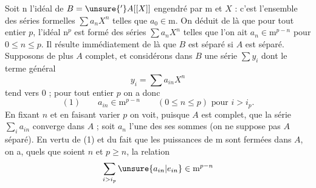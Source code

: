 Soit $\mathrm n$ l'idéal de $B=\unsure{'}A[[X]]$ engendré par $\mathrm m$ et $X$ : c'est l'ensemble des séries formelles $\sum a_nX^n$ telles que $a_0\in\mathrm m$. On déduit de là que pour tout entier $p$, l'idéal $\mathrm n^p$ est formé des séries $\sum a_nX^n$ telles que l'on ait $a_n\in\mathrm m^{p-n}$ pour $0\leqslant n\leqslant p$. Il résulte immédiatement de là que $B$ est séparé si $A$ est séparé. Supposons de plus $A$ complet, et considérons dans $B$ une série $\sum y_i$ dont le terme général
\[
y_i=\sum a_{in}X^n
\]
tend vers $0$ ; pour tout entier $p$ on a donc
\[
(1)\qquad a_{in}\in\mathrm m^{p-n}\qquad(0\leqslant n\leqslant p)\text{ pour }i>i_p.
\]
En fixant $n$ et en faisant varier $p$ on voit, puisque $A$ est complet, que la série $\sum_i a_{in}$ converge dans $A$ ; soit $a_n$ l'une des ses sommes (on ne suppose pas $A$ séparé). En vertu de (1) et du fait que les puissances de $\mathrm m$ sont fermées dans $A$, on a, quels que soient $n$ et $p\geqslant n$, la relation
\[
\sum_{i>i_p}\unsure{a_{in}|e_{in}}\in\mathrm m^{p-n}
\]



